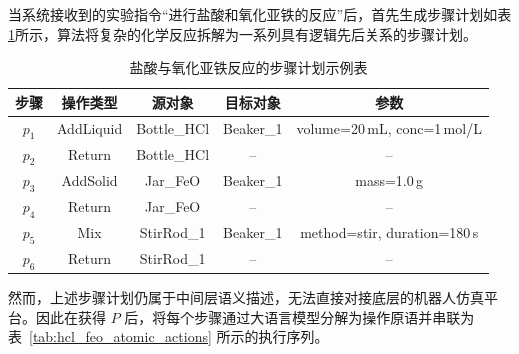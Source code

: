 当系统接收到的实验指令“进行盐酸和氧化亚铁的反应”后，首先生成步骤计划如表\ref{tab:hcl_feo_plan}所示，算法将复杂的化学反应拆解为一系列具有逻辑先后关系的步骤计划。
\begin{table}[htbp]
\centering
\caption{盐酸与氧化亚铁反应的步骤计划示例表}
\label{tab:hcl_feo_plan}
\begin{tabular}{c c c c c}
\toprule
步骤 & 操作类型 & 源对象 & 目标对象 & 参数 \\
\midrule
$p_1$ & AddLiquid & Bottle\_HCl & Beaker\_1 & volume=20\,mL, conc=1\,mol/L \\
$p_2$ & Return    & Bottle\_HCl & -- & -- \\
$p_3$ & AddSolid  & Jar\_FeO    & Beaker\_1 & mass=1.0\,g \\
$p_4$ & Return    & Jar\_FeO    & -- & -- \\
$p_5$ & Mix       & StirRod\_1  & Beaker\_1 & method=stir, duration=180\,s \\
$p_6$ & Return    & StirRod\_1  & -- & -- \\
\bottomrule
\end{tabular}
\end{table}

然而，上述步骤计划仍属于中间层语义描述，无法直接对接底层的机器人仿真平台。因此在获得 $P$ 后，将每个步骤通过大语言模型分解为操作原语并串联为表~\ref{tab:hcl_feo_atomic_actions} 所示的执行序列。

